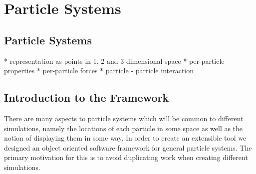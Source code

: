 \chapter{Particle Systems}

\section{Particle Systems}
* representation as points in 1, 2 and 3 dimensional space
* per-particle properties
* per-particle forces
* particle - particle interaction


\section{Introduction to the Framework}

There are many aspects to particle systems which will be common to different
simulations, namely the locations of each particle in some space as well as the
notion of displaying them in some way. In order to create an extensible tool we
designed an object oriented software framework for general particle systems.
The primary motivation for this is to avoid duplicating work when creating
different simulations.




